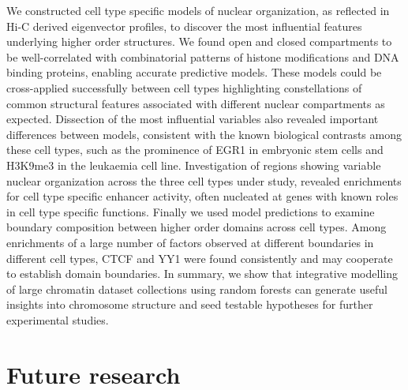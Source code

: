 \documentclass[a4paper,10pt,oneside]{book}
\begin{document}
We constructed cell type specific models of nuclear
organization, as reflected in Hi-C derived eigenvector profiles, to
discover the most influential features underlying higher order
structures. We found open and closed compartments to be
well-correlated with combinatorial patterns of histone modifications
and DNA binding proteins, enabling accurate predictive models. These
models could be cross-applied successfully between cell types
highlighting constellations of common structural features associated
with different nuclear compartments as expected. Dissection of the
most influential variables also revealed important differences between
models, consistent with the known biological contrasts among these
cell types, such as the prominence of EGR1 in embryonic stem cells and
H3K9me3 in the leukaemia cell line. Investigation of regions showing
variable nuclear organization across the three cell types under study,
revealed enrichments for cell type specific enhancer activity, often
nucleated at genes with known roles in cell type specific
functions. Finally we used model predictions to examine boundary
composition between higher order domains across cell types. Among
enrichments of a large number of factors observed at different
boundaries in different cell types, CTCF and YY1 were found
consistently and may cooperate to establish domain boundaries. In
summary, we show that integrative modelling of large chromatin dataset
collections using random forests can generate useful insights into
chromosome structure and seed testable hypotheses for further
experimental studies.

\section{Future research}

\ifstandalone
\begin{small}

\end{small}
\fi
\end{document}
